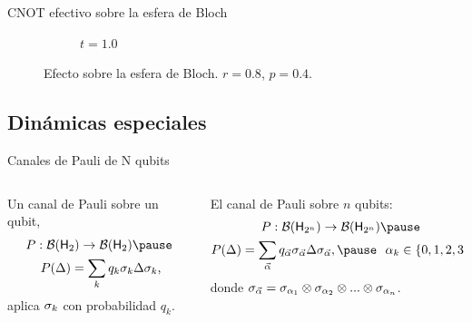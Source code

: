 \begin{frame}{CNOT efectivo sobre la esfera de Bloch}
\begin{figure}[h!]
\begin{subfigure}{0.32\textwidth}
            \caption{$t=1.0$}
        \end{subfigure}
        \caption{Efecto sobre la esfera de Bloch. $r=0.8$, $p=0.4$.}
    \end{figure}
\end{frame}


\subsection{Dinámicas especiales}

\begin{frame}{Canales de Pauli de N qubits}
    \begin{columns}
        \begin{column}{0.5\textwidth}
            Un canal de Pauli sobre un qubit,
            \begin{equation}
                \begin{gathered}
                P:\mcB(\hilbert_{2}) \rightarrow \mcB(\hilbert_{2})\nonumber\pause\\
                P(\Delta)=\sum_{k}q_{k}\pauli{k}\Delta\pauli{k} \rlap{,}
                \end{gathered}
            \end{equation}\pause
            aplica $\sigma_{k}$ con probabilidad $q_{k}$.
        \end{column}
        \pause
        \begin{column}{0.5\textwidth}
            El canal de Pauli sobre $n$ qubits:
            \begin{equation}
                \begin{gathered}
                P:\mcB(\hilbert_{2^{n}}) \rightarrow \mcB(\hilbert_{2^{n}})\nonumber\pause\\
                P(\Delta)=\sum_{\vec{\alpha}}q_{\vec{\alpha}}\pauli{\vec{\alpha}}\Delta\pauli{\vec{\alpha}},\pause \,\text{ }\, \alpha_{k}\in\{0,1,2,3\} \rlap{.}
                \end{gathered}
            \end{equation}\pause
            donde  $\sigma_{\vec{\alpha}}=\sigma_{\alpha_{1}}\otimes\sigma_{\alpha_{2}}\otimes...\otimes \sigma_{\alpha_{n}}$.
        \end{column}
    \end{columns}
\end{frame}

